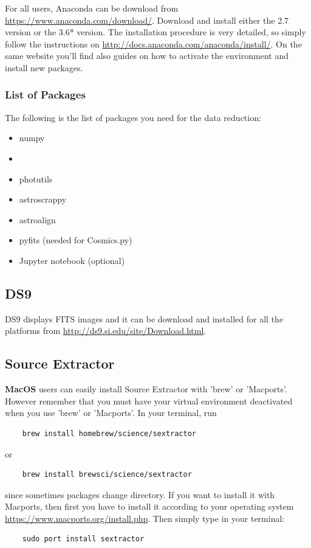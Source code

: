 \documentclass[a4paper, 11pt, fleqn]{memoir}
\begin{document}
For all users, Anaconda can be download from \url{https://www.anaconda.com/download/}.
Download and install either the 2.7 version or the 3.6* version.
The installation procedure is very detailed, so simply follow the instructions on \url{http://docs.anaconda.com/anaconda/install/}.
On the same website you'll find also guides on how to activate the environment and install new packages.

\subsubsection{List of 
    Packages}

The following is the list of  packages you need for the data reduction:
\begin{itemize}
    \item numpy
    \item {}
    \item photutils
    \item astroscrappy
    \item astroalign
    \item pyfits (needed for Cosmics.py)
    \item Jupyter notebook (optional)
\end{itemize}

\subsection{DS9}

DS9 displays FITS images and it can be download and installed for all the platforms from \url{http://ds9.si.edu/site/Download.html}.

\subsection{Source Extractor}

\textbf{MacOS} users can easily install Source Extractor with 'brew' or 'Macports'.
However remember that you must have your virtual environment deactivated when you use 'brew' or 'Macports'.
In your terminal, run
\begin{verbatim}
    brew install homebrew/science/sextractor
\end{verbatim}
or
\begin{verbatim}
    brew install brewsci/science/sextractor
\end{verbatim}
since sometimes packages change directory.
If you want to install it with Macports, then first you have to install it according to your operating system \url{https://www.macports.org/install.php}.
Then simply type in your terminal:
\begin{verbatim}
    sudo port install sextractor
\end{verbatim}
\end{document}
